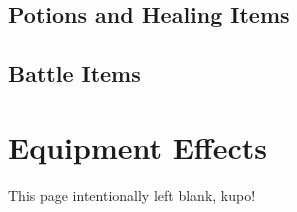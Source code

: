 \clearpage
\subsection{Potions and Healing Items}\label{subsec:potions}

\begin{tabitem}[label=inv-potions]
    
\end{tabitem}
\begin{center}
\end{center}
\clearpage
\subsection{Battle Items}\label{subsec:battleitems}

\begin{tabitem}[label=inv-battles]
    
\end{tabitem}
\begin{center}
\end{center}
\clearpage
\section{Equipment Effects}\label{sec:equipeffects}



\clearpage
\begin{center}



    \textcolor{mogred}{\arabtype\LARGE This page intentionally left blank, kupo!}

\end{center} 